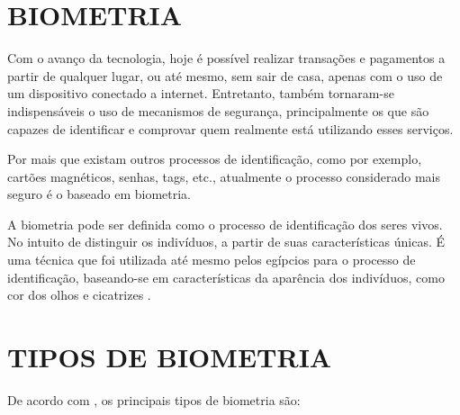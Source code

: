 \section{BIOMETRIA}\label{sec:formatacaoTexto1}

Com o avanço da tecnologia, hoje é possível realizar transações e pagamentos a 
partir de qualquer lugar, ou até mesmo, sem sair de casa, apenas com o uso de 
um dispositivo conectado a internet. Entretanto, também tornaram-se indispensáveis 
o uso de mecanismos de segurança, principalmente os que são capazes de identificar 
e comprovar quem realmente está utilizando esses serviços.

Por mais que existam outros processos de identificação, como por exemplo, cartões 
magnéticos, senhas, tags, etc., atualmente o processo considerado mais seguro é 
o baseado em biometria.

A biometria pode ser definida como o processo de identificação 
dos seres vivos. No intuito de distinguir os indivíduos, a partir de suas 
características únicas. É uma técnica que foi utilizada até mesmo pelos egípcios 
para o processo de identificação, baseando-se em características da
aparência dos indivíduos, como cor dos olhos e cicatrizes \cite{santos2007}.

\section{TIPOS DE BIOMETRIA}\label{sec:formatacaoTexto1}

De acordo com , os principais tipos de biometria são:


